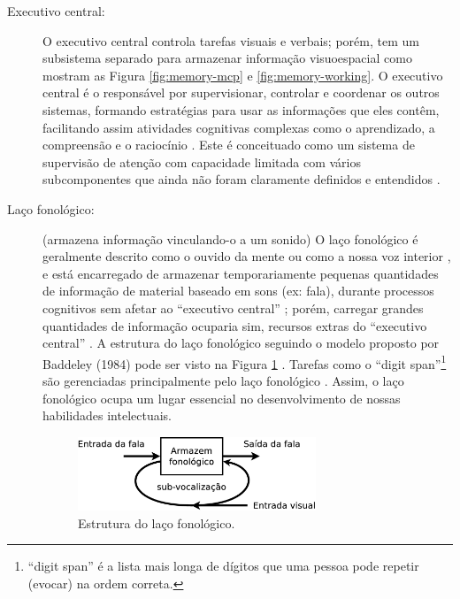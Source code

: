 \begin{description}

\item[Executivo central:]
\label{reflabel:executivocentral}
O executivo central controla tarefas visuais e verbais; 
porém, tem um subsistema separado para armazenar informação visuoespacial 
\cite[pp. 273]{braisby2012cognitive} como mostram as Figura \ref{fig:memory-mcp} e \ref{fig:memory-working}.
O executivo central  é o responsável por supervisionar, 
controlar e coordenar os outros sistemas, 
formando estratégias para usar as informações que eles contêm,
facilitando assim atividades cognitivas complexas como o aprendizado, a compreensão e o raciocínio
\cite[pp. 272]{braisby2012cognitive} \cite[pp. 678]{spreen2006compendium} \cite[pp. 126]{pake2019psicologia}.
Este é conceituado como um sistema de supervisão de atenção com capacidade limitada
\cite[pp. 272, 281]{braisby2012cognitive} \cite[pp. 678]{spreen2006compendium}
com vários subcomponentes que ainda não foram claramente definidos e entendidos
\cite[pp. 285]{braisby2012cognitive}.


\item[Laço fonológico:] (armazena informação vinculando-o a um sonido)
\label{reflabel:fonologico}
O laço fonológico é geralmente descrito como o ouvido da mente ou como a nossa voz interior \cite[pp. 122]{pake2019psicologia}, 
e está encarregado de armazenar temporariamente pequenas quantidades de informação 
de material baseado em sons (ex: fala), durante processos cognitivos
sem afetar ao ``executivo central'' 
\cite[pp. 678]{spreen2006compendium} \cite[pp. 272]{braisby2012cognitive} \cite[pp. 122]{pake2019psicologia};
porém, carregar grandes quantidades de informação ocuparia sim, recursos extras do ``executivo central''
\cite[pp. 272]{braisby2012cognitive}.
A estrutura do laço fonológico seguindo o modelo proposto por Baddeley (1984) pode ser visto na Figura  \ref{fig:lacofonologico}
\cite[pp. 276]{braisby2012cognitive}.
Tarefas como o ``digit span''\footnote{``digit span'' é a lista mais longa de dígitos que uma 
pessoa pode repetir (evocar) na ordem correta.} são gerenciadas principalmente pelo laço fonológico 
\cite[pp. 678]{spreen2006compendium}.
Assim, o laço fonológico ocupa um lugar essencial no desenvolvimento de nossas habilidades intelectuais. 
\begin{figure}[!h]
  \centering
    \includegraphics[width=0.7\textwidth]{chapters/cap-learning/fonologico.eps}
\caption{Estrutura do laço fonológico.}
\label{fig:lacofonologico}
\end{figure}


\end{description}
